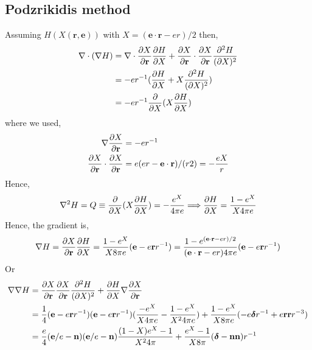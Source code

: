 \subsection{Podzrikidis method}
Assuming $H(X(\textbf{r},\textbf{e}))$ with $X= (\textbf{e}\cdot \textbf{r} -e r)/2$ then,
\begin{align*}
    \mathbf{\nabla}\cdot (\mathbf{\nabla} H) &=
    \mathbf{\nabla}\cdot \frac{\partial X}{\partial \textbf{r}} \frac{\partial H}{\partial X}
    +
    \frac{\partial X}{\partial \textbf{r}}\cdot \frac{\partial X}{\partial \textbf{r}} \frac{\partial^2 H}{(\partial X)^2}\\
    &=
    - e r^{-1} (\frac{\partial H}{\partial X}
    +
    X
    \frac{\partial^2 H}{(\partial X)^2})\\
    &=
    - e r^{-1} \frac{\partial}{\partial X}(X\frac{\partial H}{\partial X})\\
\end{align*}
where we used,
\begin{align}
    \mathbf{\nabla}\frac{\partial X}{\partial \textbf{r}}
    &=
    - e r^{-1} \\
    \frac{\partial X}{\partial \textbf{r}}\cdot \frac{\partial X}{\partial \textbf{r}}
    &=
    e(e r - \textbf{e}\cdot \textbf{r} )/(r2)
    =- \frac{eX}{r}
\end{align}
Hence,
\begin{equation}
    \mathbf{\nabla}^2 H = Q \equiv
    \frac{\partial}{\partial X}(X\frac{\partial H}{\partial X})
    =- \frac{e^{X}}{4\pi e}
    \Longrightarrow
    \frac{\partial H}{\partial X}
    = \frac{1 - e^X}{X 4 \pi e}
\end{equation}
Hence, the gradient is,
\begin{equation}
    \mathbf{\nabla} H = \frac{\partial X}{\partial \textbf{r}}\frac{\partial H}{\partial X}
    = \frac{1 - e^X}{X 8 \pi e} (\textbf{e} - e \textbf{r}r^{-1})
    = \frac{1 - e^{(\textbf{e}\cdot \textbf{r} -e r)/2}}{(\textbf{e}\cdot \textbf{r} -e r) 4 \pi e} (\textbf{e} - e \textbf{r}r^{-1})
\end{equation}
Or
\begin{align}
    \mathbf{\nabla}\mathbf{\nabla} H
    &=
    \frac{\partial X}{\partial \textbf{r}} \frac{\partial X}{\partial \textbf{r}} \frac{\partial^2 H}{(\partial X)^2}
    +\frac{\partial H}{\partial X}  \mathbf{\nabla}\frac{\partial X}{\partial \textbf{r}} \\
    &=
    \frac{1}{4}(\textbf{e} - e \textbf{r}r^{-1})
    (\textbf{e} - e \textbf{r}r^{-1})
    (\frac{-e^X}{X 4 \pi e}
    - \frac{1 - e^X}{X^2 4 \pi e})
    + \frac{1 - e^X}{X 8  \pi e}  (- e \bm\delta r^{-1} + e \textbf{rr} r^{-3})\\
    &=
    \frac{e}{4}(\textbf{e}/e - \textbf{n})
    (\textbf{e}/e - \textbf{n})
    \frac{(1-X) e^X - 1}{X^2 4 \pi}
    + \frac{e^X- 1}{X 8 \pi }  (\bm\delta  - \textbf{nn} )r^{-1}
\end{align}

